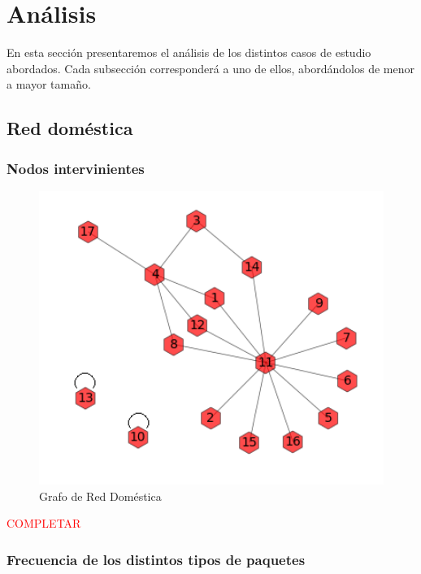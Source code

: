 

\section{An\'alisis}

En esta secci\'on presentaremos el an\'alisis de los distintos casos de estudio abordados. Cada subsecci\'on corresponder\'a a uno de ellos, abord\'andolos de menor a mayor tamaño.

\subsection{Red dom\'estica}

\subsubsection{Nodos intervinientes}


\begin{figure}[h!]
    \centering                                                       
    \includegraphics[width=400pt]{img/domesticaGraph.png}
    \caption{Grafo de Red Doméstica}
    \label{domesticaGraph}
\end{figure}

\textcolor{red}{COMPLETAR}

\subsubsection{Frecuencia de los distintos tipos de paquetes}

